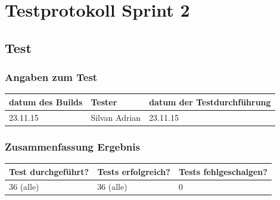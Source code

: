 \chapter{Testprotokoll Sprint 2}
\section{Test}
\subsection{Angaben zum Test}

\begin{tabularx}{\linewidth}{l l l}
\textbf{datum des Builds} & \textbf{Tester} & \textbf{datum der Testdurchführung}\\
\hline
23.11.15 & Silvan Adrian & 23.11.15

\end{tabularx}

\subsection{Zusammenfassung Ergebnis}
\begin{tabularx}{\linewidth}{l l l}
\textbf{Test durchgeführt?} & \textbf{Tests erfolgreich?} & \textbf{Tests fehlgeschalgen?}\\
\hline
36 (alle) & 36 (alle) & 0 \\
\hline
\end{tabularx}


